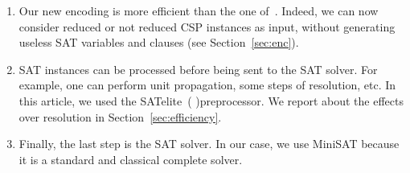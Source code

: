 \documentclass[3p,authoryear,times]{elsarticle}
\begin{document}
\begin{enumerate}
\item Our new encoding is more efficient than the one of~\cite{aor}. Indeed, we can now consider reduced or not reduced CSP instances as input, without generating useless SAT variables and clauses (see Section~\ref{sec:enc}).

\item SAT instances can be processed before being sent to the SAT solver. For example, one can perform unit propagation, some steps of resolution, etc. In this article, we used the SATelite~(\cite{satelite05} )preprocessor. We report about the effects over resolution in Section~\ref{sec:efficiency}.

\item Finally, the last step is the SAT solver. In our case, we use MiniSAT because it is a standard and classical complete solver.
\end{enumerate}
\end{document}
